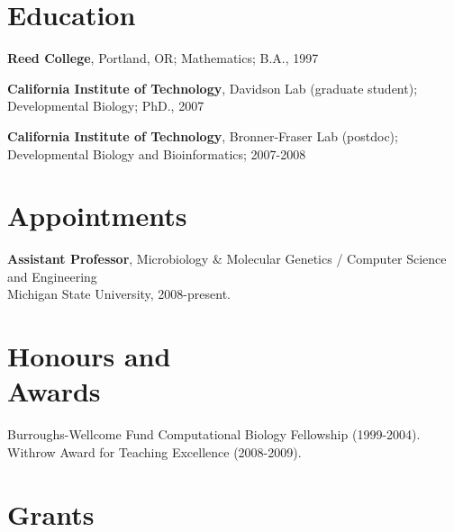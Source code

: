 \documentclass[margin,line]{resume}
\begin{document}
\begin{resume}



    \section{\mysidestyle Education}

    {\bf Reed College}, Portland, OR; Mathematics; B.A., 1997

    \vspace{2mm}

    {\bf California Institute of Technology}, Davidson Lab (graduate student);
\\
Developmental Biology; PhD., 2007

    \vspace{2mm}

    {\bf California Institute of Technology}, Bronner-Fraser Lab (postdoc);\\
 Developmental Biology and Bioinformatics; 2007-2008

    \vspace{2mm}

    \section{\mysidestyle Appointments}

    {\bf Assistant Professor}, 
Microbiology \& Molecular Genetics / Computer Science and Engineering\\
Michigan State University, 2008-present.

    \section{\mysidestyle Honours and\\Awards} 

Burroughs-Wellcome Fund Computational Biology Fellowship (1999-2004).\\
Withrow Award for Teaching Excellence (2008-2009).

    \section{\mysidestyle Grants}


\end{resume}
\end{document}
